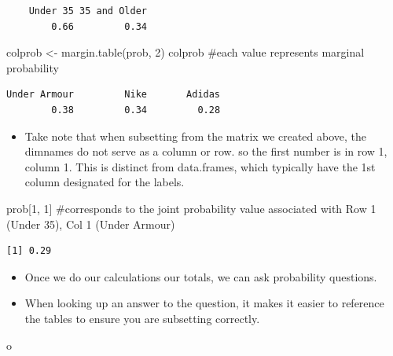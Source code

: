 \documentclass[
  letterpaper,
  DIV=11,
  numbers=noendperiod]{scrreprt}
\newenvironment{Shaded}{\begin{snugshade}}{\end{snugshade}}
\newcommand{\CommentTok}[1]{\textcolor[rgb]{0.37,0.37,0.37}{#1}}
\newcommand{\DecValTok}[1]{\textcolor[rgb]{0.68,0.00,0.00}{#1}}
\newcommand{\FunctionTok}[1]{\textcolor[rgb]{0.28,0.35,0.67}{#1}}
\newcommand{\NormalTok}[1]{\textcolor[rgb]{0.00,0.23,0.31}{#1}}
\newcommand{\OtherTok}[1]{\textcolor[rgb]{0.00,0.23,0.31}{#1}}
\providecommand{\tightlist}{%
  \setlength{\itemsep}{0pt}\setlength{\parskip}{0pt}}\usepackage{longtable,booktabs,array}
\begin{document}
\begin{verbatim}
    Under 35 35 and Older 
        0.66         0.34 
\end{verbatim}

\begin{Shaded}
\begin{Highlighting}[]
\NormalTok{colprob }\OtherTok{\textless{}{-}} \FunctionTok{margin.table}\NormalTok{(prob, }\DecValTok{2}\NormalTok{)}
\NormalTok{colprob  }\CommentTok{\#each value represents marginal probability}
\end{Highlighting}
\end{Shaded}

\begin{verbatim}
Under Armour         Nike       Adidas 
        0.38         0.34         0.28 
\end{verbatim}

\begin{itemize}
\tightlist
\item
  Take note that when subsetting from the matrix we created above, the
  dimnames do not serve as a column or row. so the first number is in
  row 1, column 1. This is distinct from data.frames, which typically
  have the 1st column designated for the labels.
\end{itemize}

\begin{Shaded}
\begin{Highlighting}[]
\NormalTok{prob[}\DecValTok{1}\NormalTok{, }\DecValTok{1}\NormalTok{]  }\CommentTok{\#corresponds to the joint probability value associated with Row 1 (Under 35), Col 1 (Under Armour)}
\end{Highlighting}
\end{Shaded}

\begin{verbatim}
[1] 0.29
\end{verbatim}

\begin{itemize}
\item
  Once we do our calculations our totals, we can ask probability
  questions.
\item
  When looking up an answer to the question, it makes it easier to
  reference the tables to ensure you are subsetting correctly.
\end{itemize}

\begin{Shaded}
\begin{Highlighting}[]
\NormalTok{o}
\end{Highlighting}
\end{Shaded}
\end{document}
